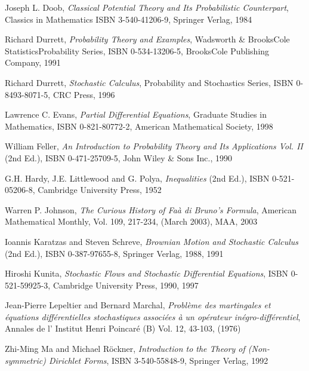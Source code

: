 \begin{thebibliography}{[88]}
     Joseph L. Doob,
     \emph{Classical Potential Theory and Its Probabilistic Counterpart},
     Classics in Mathematics
     ISBN 3-540-41206-9,
     Springer Verlag, 1984
       
     Richard Durrett,
     \emph{Probability Theory and Examples},
     Wadsworth \& Brooks\/Cole Statistics\/Probability Series,
     ISBN 0-534-13206-5,
     Brooks\/Cole Publishing Company, 1991
 
     Richard Durrett,
     \emph{Stochastic Calculus},
     Probability and Stochastics Series,
     ISBN 0-8493-8071-5,
     CRC Press, 1996                                 
 
     Lawrence C. Evans,
     \emph{Partial Differential Equations},
     Graduate Studies in Mathematics,
     ISBN 0-821-80772-2,
     American Mathematical Society, 1998 

    William Feller,
    \emph{An Introduction to Probability Theory and Its Applications Vol. II} (2nd Ed.),
    ISBN 0-471-25709-5,
    John Wiley \& Sons Inc., 1990

    G.H. Hardy, J.E. Littlewood and G. Polya,
    \emph{Inequalities} (2nd Ed.),
    ISBN 0-521-05206-8,
    Cambridge University Press, 1952

      Warren P. Johnson,
      \emph{The Curious History of Fa\`a di Bruno's Formula},
      American Mathematical Monthly, 
      Vol. 109, 217-234, (March 2003),
      MAA, 2003

     Ioannis Karatzas and Steven Schreve,
     \emph{Brownian Motion and Stochastic Calculus} (2nd Ed.),
     ISBN 0-387-97655-8,
     Springer Verlag, 1988, 1991 

    Hiroshi Kunita,
    \emph{Stochastic Flows and Stochastic Differential Equations},
    ISBN 0-521-59925-3,
    Cambridge University Press, 1990, 1997

     Jean-Pierre Lepeltier and Bernard Marchal,   
     \emph{Probl\`eme des martingales et \'equations diff\'erentielles stochastiques associ\'ees 
     \`a un opérateur in\'egro-diff\'erentiel},            
     Annales de l' Institut Henri Poincar\'e (B) Vol. 12, 43-103, (1976)  

     Zhi-Ming Ma and Michael R\"ockner,
     \emph{Introduction to the Theory of (Non-symmetric) Dirichlet Forms},
     ISBN 3-540-55848-9,
     Springer Verlag, 1992
     

\end{thebibliography}
